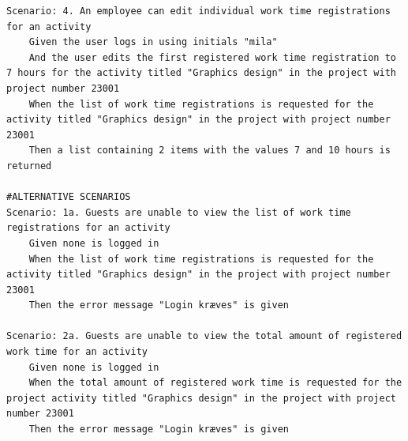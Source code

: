\begin{listing}[H]
\begin{verbatim}
Scenario: 4. An employee can edit individual work time registrations for an activity
    Given the user logs in using initials "mila"
    And the user edits the first registered work time registration to 7 hours for the activity titled "Graphics design" in the project with project number 23001
    When the list of work time registrations is requested for the activity titled "Graphics design" in the project with project number 23001
    Then a list containing 2 items with the values 7 and 10 hours is returned

#ALTERNATIVE SCENARIOS
Scenario: 1a. Guests are unable to view the list of work time registrations for an activity
    Given none is logged in
    When the list of work time registrations is requested for the activity titled "Graphics design" in the project with project number 23001
    Then the error message "Login kræves" is given

Scenario: 2a. Guests are unable to view the total amount of registered work time for an activity
    Given none is logged in
    When the total amount of registered work time is requested for the project activity titled "Graphics design" in the project with project number 23001
    Then the error message "Login kræves" is given
    \end{verbatim}
\end{listing}
